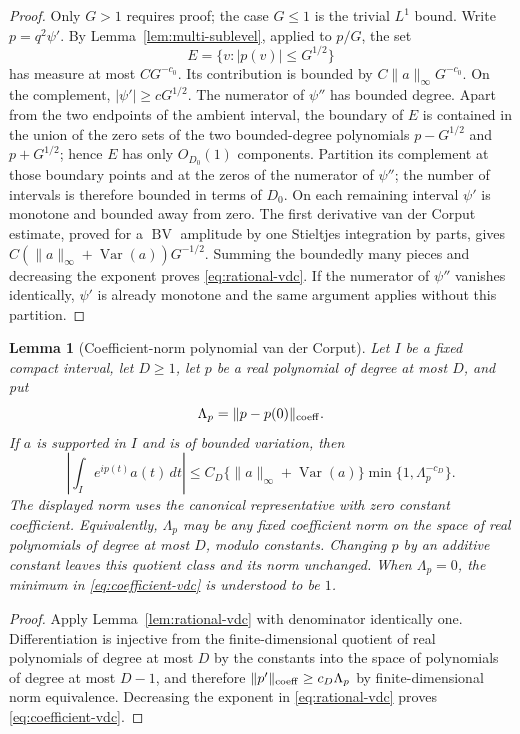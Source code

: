 \documentclass[11pt]{article}
\numberwithin{equation}{section}
\newtheorem{lemma}[theorem]{Lemma}
\theoremstyle{remark}
\theoremstyle{definition}
\newcommand{\Var}{\operatorname{Var}}
\newcommand{\norm}[1]{\lVert #1\rVert}
\newcommand{\BV}{\operatorname{BV}}
\begin{document}
\begin{proof}
Only $G>1$ requires proof; the case \(G\le1\) is the trivial \(L^1\)
bound.  Write $p=q^2\psi'$.  By
Lemma~\ref{lem:multi-sublevel}, applied to $p/G$, the set
\[
 E=\{v:|p(v)|\le G^{1/2}\}
\]
has measure at most $CG^{-c_0}$.  Its contribution is bounded by
$C\norm a_\infty G^{-c_0}$.  On the complement,
$|\psi'|\ge cG^{1/2}$.  The numerator of $\psi''$ has bounded degree.
Apart from the two endpoints of the ambient interval, the boundary of
$E$ is contained in the union of the zero sets of the two bounded-degree
polynomials $p-G^{1/2}$ and $p+G^{1/2}$; hence $E$
has only $O_{D_0}(1)$ components.  Partition its complement at those
boundary points and at the zeros of the numerator of $\psi''$; the
number of intervals is therefore bounded in terms of $D_0$.  On each remaining
interval $\psi'$ is monotone and bounded away from zero.  The first
derivative van der Corput estimate, proved for a $\BV$ amplitude by one
Stieltjes integration by parts, gives
$C(\norm a_\infty+\Var(a))G^{-1/2}$.  Summing the boundedly many pieces
and decreasing the exponent proves \eqref{eq:rational-vdc}.  If the
numerator of $\psi''$ vanishes identically, $\psi'$ is already monotone
and the same argument applies without this partition.
\end{proof}

\begin{lemma}[Coefficient-norm polynomial van der Corput]
\label{lem:coefficient-vdc}
Let $I$ be a fixed compact interval, let $D\ge1$, let $p$ be a real
polynomial of degree at most $D$, and put
\[
 \Lambda_p=\norm{p-p(0)}_{\rm coeff}.
\]
If $a$ is supported in $I$ and is of bounded variation, then
\begin{equation}\label{eq:coefficient-vdc}
 \left|\int_I e^{ip(t)}a(t)\,dt\right|
 \le C_D\{\norm a_\infty+\Var(a)\}
       \min\{1,\Lambda_p^{-c_D}\}.
\end{equation}
The displayed norm uses the canonical representative with zero constant
coefficient. Equivalently, $\Lambda_p$ may be any fixed coefficient norm
on the space of real polynomials of degree at most $D$, modulo constants.
Changing $p$ by an additive constant leaves this quotient class and its
norm unchanged.
When $\Lambda_p=0$, the minimum in
\eqref{eq:coefficient-vdc} is understood to be $1$.
\end{lemma}

\begin{proof}
Apply Lemma~\ref{lem:rational-vdc} with denominator identically one.
Differentiation is injective from the finite-dimensional quotient
of real polynomials of degree at most $D$ by the constants into the space
of polynomials of degree at most $D-1$, and therefore
$\norm{p'}_{\rm coeff}\ge c_D\Lambda_p$ by finite-dimensional norm
equivalence.  Decreasing the exponent in
\eqref{eq:rational-vdc} proves \eqref{eq:coefficient-vdc}.
\end{proof}
\end{document}
